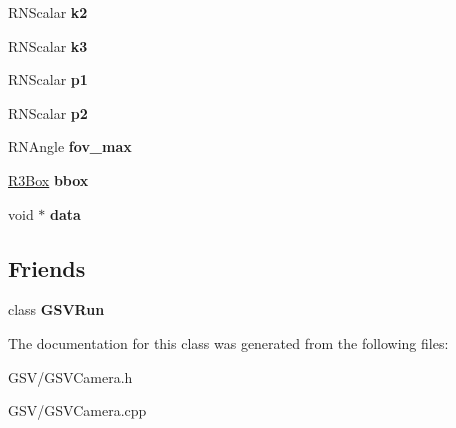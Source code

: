 \begin{DoxyCompactItemize}
\item 
R\+N\+Scalar {\bfseries k2}\hypertarget{class_g_s_v_camera_ac001ebc03aa18ca3e1b22779a0a5b988}{}\label{class_g_s_v_camera_ac001ebc03aa18ca3e1b22779a0a5b988}

\item 
R\+N\+Scalar {\bfseries k3}\hypertarget{class_g_s_v_camera_a97b6faf718563f97ef7a6e0e0f4fe7f4}{}\label{class_g_s_v_camera_a97b6faf718563f97ef7a6e0e0f4fe7f4}

\item 
R\+N\+Scalar {\bfseries p1}\hypertarget{class_g_s_v_camera_ac45bc3d4b831b1e5bc4f8e2c482c458d}{}\label{class_g_s_v_camera_ac45bc3d4b831b1e5bc4f8e2c482c458d}

\item 
R\+N\+Scalar {\bfseries p2}\hypertarget{class_g_s_v_camera_a4e263823c771b5af548175bf1266f035}{}\label{class_g_s_v_camera_a4e263823c771b5af548175bf1266f035}

\item 
R\+N\+Angle {\bfseries fov\+\_\+max}\hypertarget{class_g_s_v_camera_add7fb6d0589f26bb469533bb6fbe3c71}{}\label{class_g_s_v_camera_add7fb6d0589f26bb469533bb6fbe3c71}

\item 
\hyperlink{class_r3_box}{R3\+Box} {\bfseries bbox}\hypertarget{class_g_s_v_camera_af1a6e66150e2e0bed0374b2482b4356a}{}\label{class_g_s_v_camera_af1a6e66150e2e0bed0374b2482b4356a}

\item 
void $\ast$ {\bfseries data}\hypertarget{class_g_s_v_camera_ad61e0876b0b538e11afd345b84b7cfd7}{}\label{class_g_s_v_camera_ad61e0876b0b538e11afd345b84b7cfd7}

\end{DoxyCompactItemize}
\subsection*{Friends}
\begin{DoxyCompactItemize}
\item 
class {\bfseries G\+S\+V\+Run}\hypertarget{class_g_s_v_camera_ae54f10cc7f586c4696bcda2addbb27e0}{}\label{class_g_s_v_camera_ae54f10cc7f586c4696bcda2addbb27e0}

\end{DoxyCompactItemize}


The documentation for this class was generated from the following files\+:\begin{DoxyCompactItemize}
\item 
G\+S\+V/G\+S\+V\+Camera.\+h\item 
G\+S\+V/G\+S\+V\+Camera.\+cpp\end{DoxyCompactItemize}
